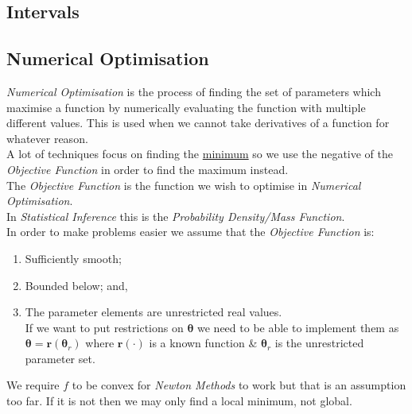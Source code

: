 \documentclass[11pt,a4paper]{article}
\begin{document}
\subsection{Intervals}



\subsection{Numerical Optimisation}

\textit{Numerical Optimisation} is the process of finding the set of parameters which maximise a function by numerically evaluating the function with multiple different values. This is used when we cannot take derivatives of a function for whatever reason.\\
\nb A lot of techniques focus on finding the \underline{minimum} so we use the negative of the \textit{Objective Function} in order to find the maximum instead.\\

The \textit{Objective Function} is the function we wish to optimise in \textit{Numerical Optimisation}.\\
\nb In \textit{Statistical Inference} this is the \textit{Probability Density/Mass Function}.\\

In order to make problems easier we assume that the \textit{Objective Function} is:
\begin{enumerate}
	\item Sufficiently smooth;
	\item Bounded below; and,
	\item The parameter elements are unrestricted real values.\\
	If we want to put restrictions on $\pmb\theta$ we need to be able to implement them as $\pmb\theta=\textbf{r}(\pmb\theta_r)$ where $\textbf{r}(\cdot)$ is a known function \& $\pmb\theta_r$ is the unrestricted parameter set.
\end{enumerate}
\nb We require $f$ to be convex for \textit{Newton Methods} to work but that is an assumption too far. If it is not then we may only find a local minimum, not global.\\
\end{document}
